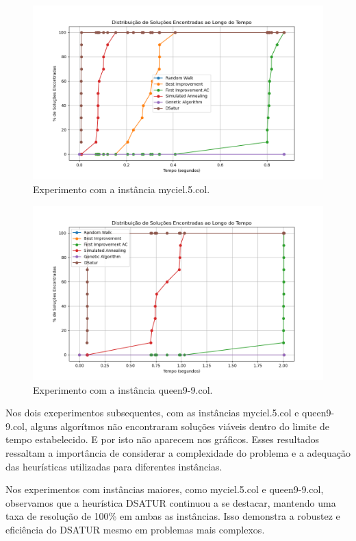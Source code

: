 \documentclass[12pt,a4paper]{article}
\begin{document}
\begin{figure}[H]
    \centering
    \includegraphics[width=1\textwidth]{./img/output-myciel5.png}
    \caption{Experimento com a instância myciel.5.col.}
    \label{fig:experimento-myciel5}
\end{figure}

\begin{figure}[H]
    \centering
    \includegraphics[width=1\textwidth]{./img/output-queen9-9.png}
    \caption{Experimento com a instância queen9-9.col.}
    \label{fig:experimento-queen9-9}
\end{figure}

Nos dois exeperimentos subsequentes, com as instâncias myciel.5.col e queen9-9.col, alguns algorítmos não encontraram soluções viáveis dentro do limite de tempo estabelecido. E por isto não aparecem nos gráficos. Esses resultados ressaltam a importância de considerar a complexidade do problema e a adequação das heurísticas utilizadas para diferentes instâncias.

Nos experimentos com instâncias maiores, como myciel.5.col e queen9-9.col, observamos que a heurística DSATUR continuou a se destacar, mantendo uma taxa de resolução de 100\% em ambas as instâncias. Isso demonstra a robustez e eficiência do DSATUR mesmo em problemas mais complexos.
\end{document}
